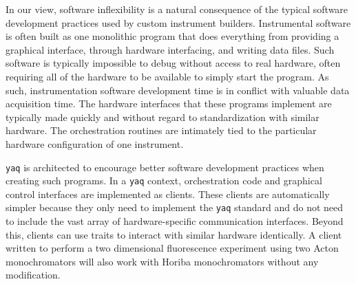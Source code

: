\documentclass[aip, amsmath, amssymb, reprint,]{revtex4-2}
\newcommand\yaq{\texttt{yaq}}
\begin{document}
In our view, software inflexibility is a natural consequence of the typical software development practices used by custom instrument builders.
Instrumental software is often built as one monolithic program that does everything from providing a graphical interface, through hardware interfacing, and writing data files.
Such software is typically impossible to debug without access to real hardware, often requiring all of the hardware to be available to simply start the program.
As such, instrumentation software development time is in conflict with valuable data acquisition time.
The hardware interfaces that these programs implement are typically made quickly and without regard to standardization with similar hardware.
The orchestration routines are intimately tied to the particular hardware configuration of one instrument.

\yaq{} is architected to encourage better software development practices when creating such programs.
In a \yaq{} context, orchestration code and graphical control interfaces are implemented as clients.
These clients are automatically simpler because they only need to implement the \yaq{} standard and do not need to include the vast array of hardware-specific communication interfaces.
Beyond this, clients can use traits to interact with similar hardware identically.
A client written to perform a two dimensional fluorescence experiment using two Acton monochromators will also work with Horiba monochromators without any modification.
\end{document}
